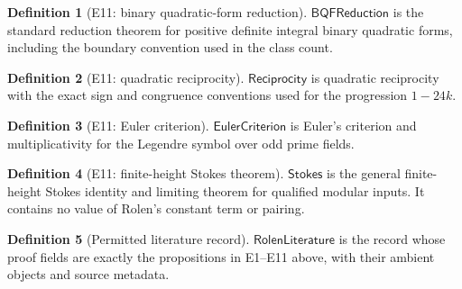 \documentclass[11pt,a4paper]{article}
\numberwithin{equation}{section}
\theoremstyle{plain}\newtheorem{theorem}{Theorem}[section]\newaliascnt{proposition}{theorem}\newtheorem{proposition}[proposition]{Proposition}\aliascntresetthe{proposition}\newaliascnt{lemma}{theorem}\newtheorem{lemma}[lemma]{Lemma}\aliascntresetthe{lemma}
\theoremstyle{definition}\newaliascnt{definition}{theorem}\newtheorem{definition}[definition]{Definition}\aliascntresetthe{definition}\newaliascnt{notation}{theorem}\newtheorem{notation}[notation]{Notation}\aliascntresetthe{notation}
\providecommand{\lean}[1]{}\providecommand{\leanok}{}
\begin{document}
\begin{definition}[E11: binary quadratic-form reduction]\label{def_ext_elementary}\lean{SptCM.RolenLiterature.BinaryQuadraticFormReduction}\leanok
$\mathsf{BQFReduction}$ is the standard reduction theorem for positive definite integral binary quadratic forms, including the boundary convention used in the class count.
\end{definition}
\begin{definition}[E11: quadratic reciprocity]\label{def_ext_reciprocity}\lean{SptCM.RolenLiterature.QuadraticReciprocityInput}\leanok
$\mathsf{Reciprocity}$ is quadratic reciprocity with the exact sign and congruence conventions used for the progression $1-24k$.
\end{definition}
\begin{definition}[E11: Euler criterion]\label{def_ext_euler_criterion}\lean{SptCM.RolenLiterature.EulerCriterionInput}\leanok
$\mathsf{EulerCriterion}$ is Euler's criterion and multiplicativity for the Legendre symbol over odd prime fields.
\end{definition}
\begin{definition}[E11: finite-height Stokes theorem]\label{def_ext_stokes}\lean{SptCM.RolenLiterature.FiniteHeightStokesTheorem}\leanok
$\mathsf{Stokes}$ is the general finite-height Stokes identity and limiting theorem for qualified modular inputs.  It contains no value of Rolen's constant term or pairing.
\end{definition}
\begin{definition}[Permitted literature record]\label{def_rolen_literature}\lean{SptCM.RolenLiterature.Repair.UniformRolenLiterature}\leanok
$\mathsf{RolenLiterature}$ is the record whose proof fields are exactly the propositions in E1--E11 above, with their ambient objects and source metadata.
\end{definition}
\end{document}
